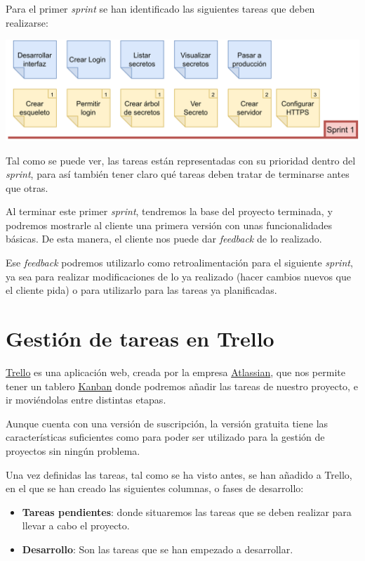 \documentclass{\ClassPath/viu-tfm-template}
\begin{document}
Para el primer \textit{sprint} se han identificado las siguientes tareas que deben realizarse:

\begin{center}
    \includegraphics[width=\linewidth]{img/sprint1.png}
\end{center}

Tal como se puede ver, las tareas están representadas con su prioridad dentro del \textit{sprint}, para así también tener claro qué tareas deben tratar de terminarse antes que otras.

Al terminar este primer \textit{sprint}, tendremos la base del proyecto terminada, y podremos mostrarle al cliente una primera versión con unas funcionalidades básicas. De esta manera, el cliente nos puede dar \textit{feedback} de lo realizado.

 Ese \textit{feedback} podremos utilizarlo como retroalimentación para el siguiente \textit{sprint}, ya sea para realizar modificaciones de lo ya realizado (hacer cambios nuevos que el cliente pida) o para utilizarlo para las tareas ya planificadas.


\chapter{Gestión de tareas en Trello}

\href{https://trello.com/}{Trello} es una aplicación web, creada por la empresa \href{https://www.atlassian.com/}{Atlassian}, que nos permite tener un tablero \href{https://en.wikipedia.org/wiki/Kanban_(development)}{Kanban} donde podremos añadir las tareas de nuestro proyecto, e ir moviéndolas entre distintas etapas.

Aunque cuenta con una versión de suscripción, la versión gratuita tiene las características suficientes como para poder ser utilizado para la gestión de proyectos sin ningún problema.

Una vez definidas las tareas, tal como se ha visto antes, se han añadido a Trello, en el que se han creado las siguientes columnas, o fases de desarrollo:

\begin{itemize}
    \item \textbf{Tareas pendientes}: donde situaremos las tareas que se deben realizar para llevar a cabo el proyecto.
    \item \textbf{Desarrollo}: Son las tareas que se han empezado a desarrollar.
\end{itemize}
\end{document}
